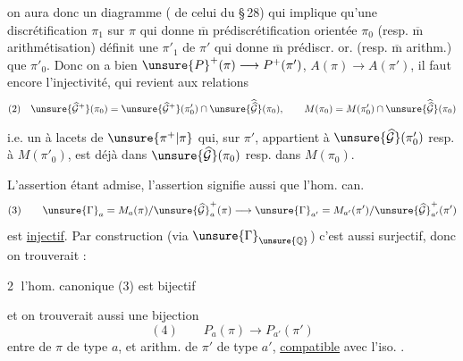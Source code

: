 on aura donc un diagramme ( de celui du \S\,28)
qui  implique qu'une discrétification $\pi_1$ sur $\pi$ qui donne $\overline{\mathrm m}$ prédiscrétification orientée  $\pi_0$ (resp. $\overline{\mathrm m}$ arithmétisation) définit une  $\pi'_1$ de $\pi'$ qui donne $\overline{\mathrm m}$ prédiscr. or. (resp. $\overline{\mathrm m}$ arithm.) que $\pi'_0$. Donc on a bien $\unsure{P}^{+}(\pi)\longrightarrow P^+(\pi')$, $A(\pi)\longrightarrow A(\pi')$, il faut encore  l'injectivité, qui revient aux relations
\[
\begin{gathered}
(2)\quad
\unsure{\widehat{\mathcal G}^{+}}(\pi_0)
=
\unsure{\widehat{\mathcal G}^{+}}(\pi'_0)\cap
\unsure{\widehat{\widehat{\mathcal G}}}(\pi_0),\qquad
M(\pi_0)=M(\pi'_0)\cap
\unsure{\widehat{\widehat{\mathcal G}}}(\pi_0)
\end{gathered}
\]

i.e. un  à lacets de $\unsure{\pi^{+}|\pi}$ qui, sur $\pi'$, appartient à $\unsure{\widehat{\mathcal G}}(\pi'_0)$  resp. à $M(\pi'_0)$, est déjà dans $\unsure{\widehat{\mathcal G}}(\pi_0)$ resp. dans $M(\pi_0)$.

L'assertion   étant admise, l'assertion   signifie aussi que l'hom. can.
\[
(3)\qquad
\unsure{\Gamma}_a=M_a(\pi)/\unsure{\widehat{\mathcal G}}^{+}_a(\pi)
\longrightarrow
\unsure{\Gamma}_{a'}=M_{a'}(\pi')/\unsure{\widehat{\mathcal G}}^{+}_{a'}(\pi')
\]
est \uline{injectif}. Par construction (via $\unsure{\Gamma}_{\unsure{\mathbb Q}}$) c'est aussi surjectif, donc on trouverait :

\textcircled{2} l'hom. canonique (3) est bijectif

et on trouverait aussi une bijection
\[
(4)\qquad P_a(\pi)\longrightarrow P_{a'}(\pi')
\]
entre  de $\pi$ de type $a$, et arithm. de $\pi'$ de type $a'$, \uline{compatible} avec l'iso. .

